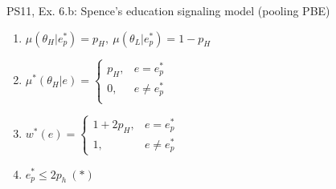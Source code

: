 \begin{frame}{PS11, Ex. 6.b: Spence’s education signaling model (pooling PBE)}
\begin{multicols}{2}
\begin{enumerate}
        \item $\mu\left(\theta_H|e_p^*\right)=p_H,\
               \mu\left(\theta_L|e_p^*\right)=1-p_H$
        \item $\mu^*(\theta_H|e)=\left\{\begin{array}{ll}
                  p_H, & e = e_p^* \\
                  0, & e \neq e_p^* \\
               \end{array}\right.$
        \item $w^*(e)=\left\{\begin{array}{ll}
                  1+2p_H, & e = e_p^* \\
                  1, & e \neq e_p^*
               \end{array}\right.$
        \item $e_p^*\leq2p_h\ (*)$
      \end{enumerate}
      \vfill\null
    \end{multicols}
\end{frame}
